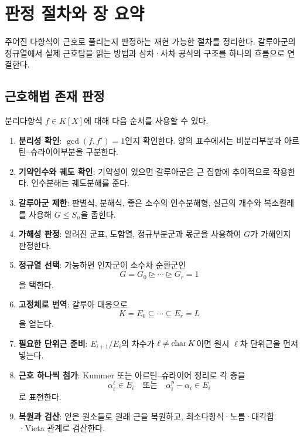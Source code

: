 \clearpage
\section{판정 절차와 장 요약}
\label{sec:radicals-solvable-workflow}

\begin{learninggoal}
주어진 다항식이 근호로 풀리는지 판정하는 재현 가능한 절차를 정리한다. 갈루아군의 정규열에서 실제 근호탑을 읽는 방법과 삼차·사차 공식의 구조를 하나의 흐름으로 연결한다.
\end{learninggoal}

\subsection{근호해법 존재 판정}

분리다항식 $f\in K[X]$에 대해 다음 순서를 사용할 수 있다.

\begin{enumerate}
  \item \textbf{분리성 확인}: $\gcd(f,f')=1$인지 확인한다. 양의 표수에서는 비분리부분과 아르틴--슈라이어부분을 구분한다.
  \item \textbf{기약인수와 궤도 확인}: 기약성이 있으면 갈루아군은 근 집합에 추이적으로 작용한다. 인수분해는 궤도분해를 준다.
  \item \textbf{갈루아군 제한}: 판별식, 분해식, 좋은 소수의 인수분해형, 실근의 개수와 복소켤레를 사용해 $G\le S_n$을 좁힌다.
  \item \textbf{가해성 판정}: 알려진 군표, 도함열, 정규부분군과 몫군을 사용하여 $G$가 가해인지 판정한다.
  \item \textbf{정규열 선택}: 가능하면 인자군이 소수차 순환군인
  \[
    G=G_0\trianglerighteq\cdots\trianglerighteq G_r=1
  \]
  을 택한다.
  \item \textbf{고정체로 번역}: 갈루아 대응으로
  \[
    K=E_0\subseteq\cdots\subseteq E_r=L
  \]
  을 얻는다.
  \item \textbf{필요한 단위근 준비}: $E_{i+1}/E_i$의 차수가 $\ell\ne\operatorname{char} K$이면 원시 $\ell$차 단위근을 먼저 넣는다.
  \item \textbf{근호 하나씩 첨가}: Kummer 또는 아르틴--슈라이어 정리로 각 층을
  \[
    \alpha_i^\ell\in E_i
    \quad\text{또는}\quad
    \alpha_i^p-\alpha_i\in E_i
  \]
  로 표현한다.
  \item \textbf{복원과 검산}: 얻은 원소들로 원래 근을 복원하고, 최소다항식·노름·대각합·Vieta 관계로 검산한다.
\end{enumerate}


